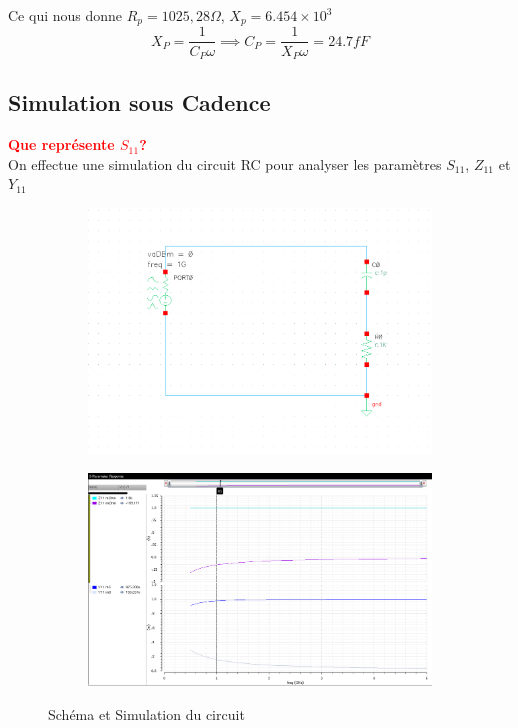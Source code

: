 \documentclass[a4paper]{article}
\begin{document}
Ce qui nous donne $R_p = 1025,28 \Omega$, $X_p = 6.454 \times 10^3$
\[
X_P = \frac{1}{C_P \omega} \implies C_P = \frac{1}{X_P \omega} = 24.7 fF
\]

\subsection{Simulation sous Cadence}
\textcolor{red}{\textbf{Que repr\'esente $S_{11}$?}}\\
On effectue une simulation du circuit RC pour analyser les param\`etres $S_{11}$, $Z_{11}$ et $Y_{11}$

\begin{figure}[!htb]
  \begin{subfigure}[t]{.5\linewidth}
      \centering
      \includegraphics[width=1.1\linewidth]{circuit-RC.png}
      \label{fig:rccircuit}
  \end{subfigure}%
  \begin{subfigure}[t]{.5\linewidth}
    \centering
    \includegraphics[width=1.1\linewidth]{sim-inital.png}
    \label{fig:rccircuit-sim}
  \end{subfigure}%
  \caption{Sch\'ema et Simulation du circuit}
  \label{fig:RC-sim}
\end{figure}
\end{document}
